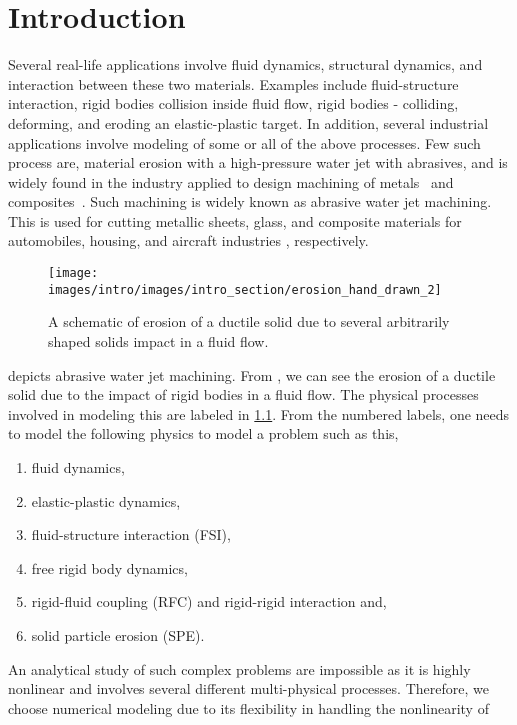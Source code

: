 \chapter{Introduction}
\label{chap:SPH}
Several real-life applications involve fluid dynamics, structural dynamics, and
interaction between these two materials. Examples include fluid-structure
interaction, rigid bodies collision inside fluid flow, rigid bodies - colliding,
deforming, and eroding an elastic-plastic target. In addition, several
industrial applications involve modeling of some or all of the above processes.
Few such process are, material erosion with a high-pressure water jet with
abrasives, and is widely found in the industry applied to design machining of
metals~\citep{llanto_recent_2021} and composites~\citep{alberdi_composite_2013}.
Such machining is widely known as abrasive water jet machining. This is used for
cutting metallic sheets, glass, and composite materials for automobiles,
housing, and aircraft industries
\citep{alberdi_composite_2013,aich_abrasive_2014,llanto_recent_2021},
respectively.
\begin{figure}
  \centering
  \texttt{[image: images/intro/images/intro\_section/erosion\_hand\_drawn\_2]}
  \caption{A schematic of erosion of a ductile solid due to several arbitrarily
    shaped solids impact in a fluid flow.}
\label{fig:intro-big-picture}
\end{figure}
 depicts abrasive water jet machining. From
, we can see the erosion of a ductile solid due to
the impact of rigid bodies in a fluid flow. The physical processes involved in
modeling this are labeled in \cref{fig:intro-big-picture}. From the numbered
labels, one needs to model the following physics to model a problem such as this,
\begin{enumerate}
\item fluid dynamics,
\item elastic-plastic dynamics,
\item fluid-structure interaction (FSI),
\item free rigid body dynamics,
\item rigid-fluid coupling (RFC) and rigid-rigid interaction and,
\item solid particle erosion (SPE).
\end{enumerate}
An analytical study of such complex problems are impossible as it is highly
nonlinear and involves several different multi-physical processes. Therefore, we
choose numerical modeling due to its flexibility in handling the nonlinearity of
